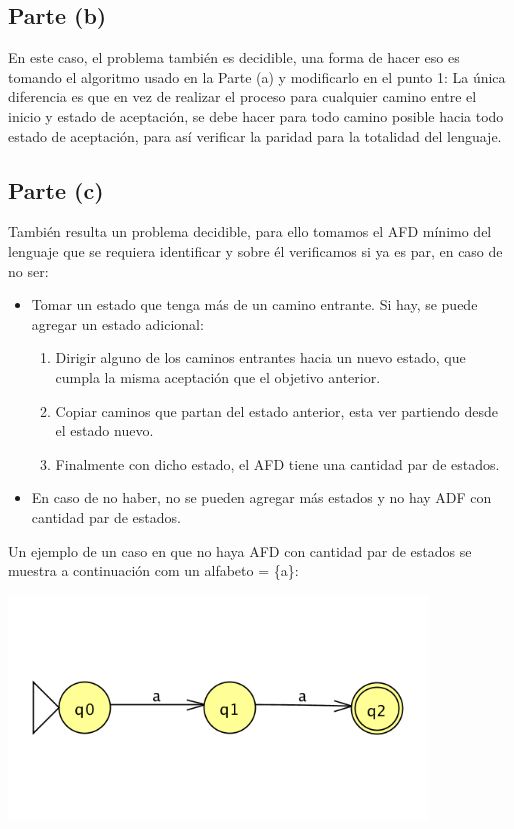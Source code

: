 \documentclass[11pt,letterpaper]{article}
\begin{document}
\subsection{Parte (b)}
En este caso, el problema también es decidible, una forma de hacer eso es tomando el algoritmo usado en la Parte (a) y modificarlo en el punto 1:
La única diferencia es que en vez de realizar el proceso para cualquier camino entre el inicio y estado de aceptación, se debe hacer para todo camino posible hacia todo estado de aceptación, para así verificar la paridad para la totalidad del lenguaje.

\subsection{Parte (c)}
También resulta un problema decidible, para ello tomamos el AFD mínimo del lenguaje que se requiera identificar y sobre él verificamos si ya es par, en caso de no ser:
\begin{itemize}
	\item Tomar un estado que tenga más de un camino entrante. Si hay, se puede agregar un estado adicional:
		\begin{enumerate}
			\item Dirigir alguno de los caminos entrantes hacia un nuevo estado, que cumpla la misma aceptación que el objetivo anterior.
			\item Copiar caminos que partan del estado anterior, esta ver partiendo desde el estado nuevo.
			\item Finalmente con dicho estado, el AFD tiene una cantidad par de estados.
		\end{enumerate}
	\item En caso de no haber, no se pueden agregar más estados y no hay ADF con cantidad par de estados.
\end{itemize}

Un ejemplo de un caso en que no haya AFD con cantidad par de estados se muestra a continuación com un alfabeto = \{a\}:
\begin{center}
\includegraphics[height=6cm]{tarea_5-c.png}
\end{center}
\end{document}
